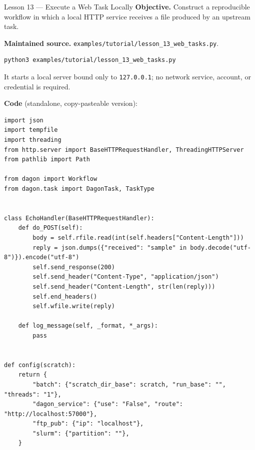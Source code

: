\begin{lessonbox}{Lesson 13 --- Execute a Web Task Locally}
\textbf{Objective.} Construct a reproducible workflow in which a local HTTP
service receives a file produced by an upstream task.

\textbf{Maintained source.} \texttt{examples/tutorial/lesson\_13\_web\_tasks.py}.
\begin{lstlisting}[style=bash]
python3 examples/tutorial/lesson_13_web_tasks.py
\end{lstlisting}
It starts a local server bound only to \texttt{127.0.0.1}; no network
service, account, or credential is required.

\textbf{Code} (standalone, copy-pasteable version):
\begin{lstlisting}
import json
import tempfile
import threading
from http.server import BaseHTTPRequestHandler, ThreadingHTTPServer
from pathlib import Path

from dagon import Workflow
from dagon.task import DagonTask, TaskType


class EchoHandler(BaseHTTPRequestHandler):
    def do_POST(self):
        body = self.rfile.read(int(self.headers["Content-Length"]))
        reply = json.dumps({"received": "sample" in body.decode("utf-8")}).encode("utf-8")
        self.send_response(200)
        self.send_header("Content-Type", "application/json")
        self.send_header("Content-Length", str(len(reply)))
        self.end_headers()
        self.wfile.write(reply)

    def log_message(self, _format, *_args):
        pass


def config(scratch):
    return {
        "batch": {"scratch_dir_base": scratch, "run_base": "", "threads": "1"},
        "dagon_service": {"use": "False", "route": "http://localhost:57000"},
        "ftp_pub": {"ip": "localhost"},
        "slurm": {"partition": ""},
    }



\end{lstlisting}
\end{lessonbox}
